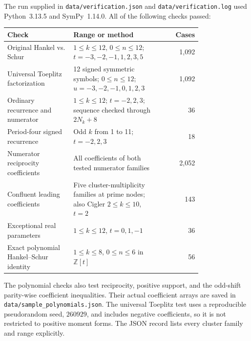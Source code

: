 \documentclass[11pt]{article}
\theoremstyle{definition}
\theoremstyle{remark}
\newcommand{\Z}{\mathbb Z}
\theoremstyle{definition}
\theoremstyle{plain}
\numberwithin{equation}{section}
\begin{document}
The run supplied in \texttt{data/verification.json} and
\texttt{data/verification.log} used Python~3.13.5 and SymPy~1.14.0.
All of the following checks passed:
\begin{center}
\small
\begin{tabular}{@{}p{0.34\linewidth}p{0.45\linewidth}r@{}}
\toprule
Check & Range or method & Cases\\
\midrule
Original Hankel vs. Schur & $1\le k\le12$, $0\le n\le12$;
$t=-3,-2,-1,1,2,3,5$ & 1,092\\[3pt]
Universal Toeplitz factorization & 12 signed symmetric symbols;
$0\le n\le12$; $u=-3,-2,-1,0,1,2,3$ & 1,092\\[3pt]
Ordinary recurrence and numerator & $1\le k\le12$; $t=-2,2,3$;
sequence checked through $2N_k+8$ & 36\\[3pt]
Period-four signed recurrence & Odd $k$ from 1 to 11; $t=-2,2,3$ & 18\\[3pt]
Numerator reciprocity coefficients & All coefficients of both tested
numerator families & 2,052\\[3pt]
Confluent leading coefficients & Five cluster-multiplicity families at
prime nodes; also Cigler $2\le k\le10$, $t=2$ & 143\\[3pt]
Exceptional real parameters & $1\le k\le12$, $t=0,1,-1$ & 36\\[3pt]
Exact polynomial Hankel--Schur identity & $1\le k\le8$, $0\le n\le6$
in $\Z[t]$ & 56\\
\bottomrule
\end{tabular}
\end{center}
The polynomial checks also test reciprocity, positive support, and the
odd-shift parity-wise coefficient inequalities. Their actual coefficient
arrays are saved in \texttt{data/sample\_polynomials.json}. The universal
Toeplitz test uses a reproducible pseudorandom seed, $260929$, and includes
negative coefficients, so it is not restricted to positive moment forms.
The JSON record lists every cluster family and range explicitly.
\end{document}
